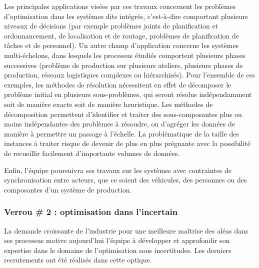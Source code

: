 	Les principales applications visées par ces travaux concernent les problèmes d'optimisation dans les systèmes dits intégrés, c'est-à-dire comportant plusieurs niveaux de décisions (par exemple problèmes joints de planification et ordonnancement, de localisation et de routage, problèmes de planification de tâches et de personnel). Un autre champ d'application concerne les systèmes multi-échelons, 
	dans lesquels les processus étudiés comportent plusieurs phases successives (problème de production sur plusieurs ateliers, plusieurs phases de production, réseaux logistiques complexes ou hiérarchisés). 
	Pour l'ensemble de ces exemples, les méthodes de résolution nécessitent en effet de décomposer le problème initial en plusieurs sous-problèmes, qui seront résolus indépendamment soit de manière exacte soit de manière heuristique.  Les méthodes de décomposition permettent d'identifier et traiter des sous-composantes plus ou moins indépendantes des problèmes à résoudre, ou d'agréger les données de manière à permettre un passage à l'échelle. 
	La problématique de la taille des instances à traiter risque de devenir de plus en plus prégnante avec la possibilité de recueillir facilement d'importants volumes de données. 
	
	Enfin, l'équipe poursuivra ses travaux sur les systèmes avec contraintes de synchronisation entre acteurs, que ce soient des véhicules, des personnes ou des composantes d'un système de production. 
	
	
	\subsubsection*{Verrou \# 2 : optimisation dans l'incertain}
	
	
	La demande croissante de l'industrie pour une meilleure maîtrise des aléas dans ses processus motive aujourd'hui l'équipe à développer et approfondir son expertise dans le domaine de l'optimisation sous incertitudes. Les derniers recrutements ont été réalisés dans cette optique. 
	
